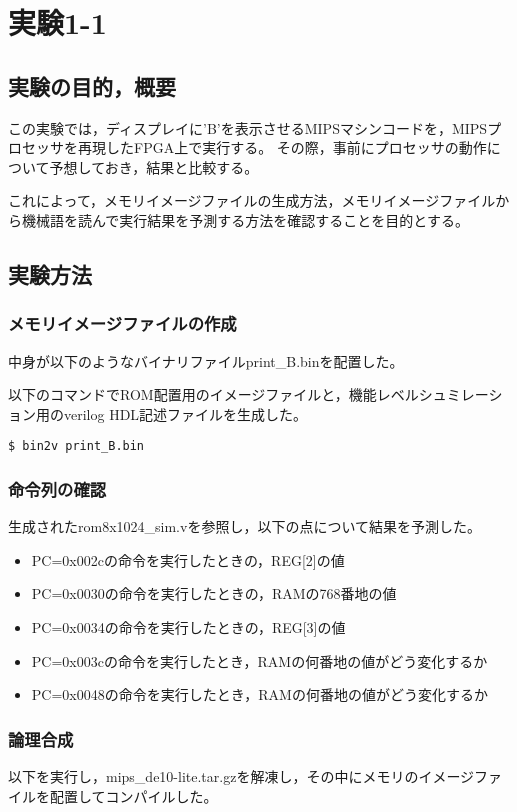 
\section{実験1-1}
\subsection{実験の目的，概要}
この実験では，ディスプレイに'B'を表示させるMIPSマシンコードを，MIPSプロセッサを再現したFPGA上で実行する。
その際，事前にプロセッサの動作について予想しておき，結果と比較する。

これによって，メモリイメージファイルの生成方法，メモリイメージファイルから機械語を読んで実行結果を予測する方法を確認することを目的とする。

\subsection{実験方法}
\subsubsection{メモリイメージファイルの作成}
中身が以下のようなバイナリファイルprint\_B.binを配置した。


以下のコマンドでROM配置用のイメージファイルと，機能レベルシュミレーション用のverilog HDL記述ファイルを生成した。
\begin{lstlisting}[caption={イメージファイルの作成},label={イメージファイルの作成1-1}]
  $ bin2v print_B.bin
\end{lstlisting}

\subsubsection{命令列の確認}
生成されたrom8x1024\_sim.vを参照し，以下の点について結果を予測した。
\begin{itemize}
  \item PC=0x002cの命令を実行したときの，REG[2]の値
  \item PC=0x0030の命令を実行したときの，RAMの768番地の値
  \item PC=0x0034の命令を実行したときの，REG[3]の値
  \item PC=0x003cの命令を実行したとき，RAMの何番地の値がどう変化するか
  \item PC=0x0048の命令を実行したとき，RAMの何番地の値がどう変化するか
\end{itemize}

\subsubsection{論理合成}
以下を実行し，mips\_de10-lite.tar.gzを解凍し，その中にメモリのイメージファイルを配置してコンパイルした。

